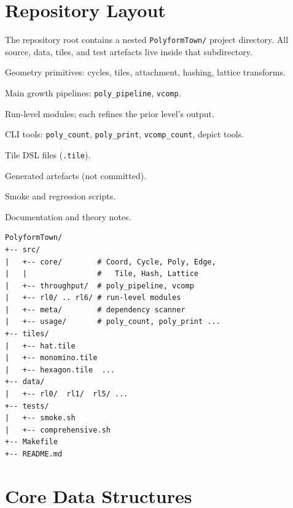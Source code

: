 \documentclass[10pt,a4paper]{article}
\newcommand{\code}[1]{\texttt{\small #1}}
\newcommand{\file}[1]{\texttt{\footnotesize #1}}
\begin{document}
\section{Repository Layout}

\begin{tcolorbox}[dualbox, title=Directory Structure]
  The repository root contains a nested \file{PolyformTown/}
  project directory.  All source, data, tiles, and test artefacts live
  inside that subdirectory.

  \begin{description}[leftmargin=0pt, style=nextline]
    \item[\file{src/core/}] Geometry primitives: cycles, tiles,
      attachment, hashing, lattice transforms.
    \item[\file{src/throughput/}] Main growth pipelines:
      \code{poly\_pipeline}, \code{vcomp}.
    \item[\file{src/rl0/}--\file{src/rl6/}] Run-level modules; each
      refines the prior level's output.
    \item[\file{src/usage/}] CLI tools: \code{poly\_count},
      \code{poly\_print}, \code{vcomp\_count}, depict tools.
    \item[\file{tiles/}] Tile DSL files (\file{.tile}).
    \item[\file{data/}] Generated artefacts (not committed).
    \item[\file{tests/}] Smoke and regression scripts.
    \item[\file{manual/}] Documentation and theory notes.
  \end{description}
\tcblower
\begin{verbatim}
PolyformTown/
+-- src/
|   +-- core/        # Coord, Cycle, Poly, Edge,
|   |                #   Tile, Hash, Lattice
|   +-- throughput/  # poly_pipeline, vcomp
|   +-- rl0/ .. rl6/ # run-level modules
|   +-- meta/        # dependency scanner
|   +-- usage/       # poly_count, poly_print ...
+-- tiles/
|   +-- hat.tile
|   +-- monomino.tile
|   +-- hexagon.tile  ...
+-- data/
|   +-- rl0/  rl1/  rl5/ ...
+-- tests/
|   +-- smoke.sh
|   +-- comprehensive.sh
+-- Makefile
+-- README.md
\end{verbatim}
\end{tcolorbox}

\section{Core Data Structures}
\end{document}
